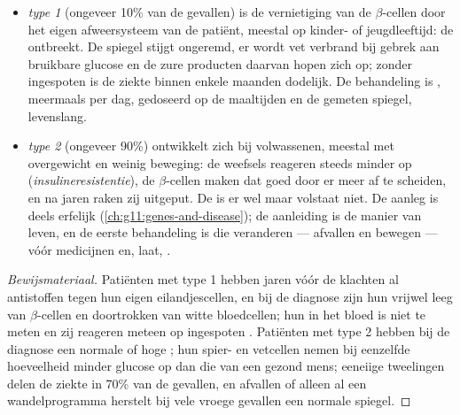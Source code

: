 \begin{proposition}\label{prop:g12:glucose-and-diabetes:types}
\begin{itemize}
  \item \emph{ type 1} (ongeveer 10\% van de gevallen) is de
        vernietiging van de $\beta$-cellen door het eigen afweersysteem
        van de patiënt, meestal op kinder- of jeugdleeftijd: de 
        ontbreekt. De spiegel stijgt ongeremd, er wordt vet verbrand bij
        gebrek aan bruikbare glucose en de zure producten daarvan hopen
        zich op; zonder ingespoten  is de ziekte binnen enkele
        maanden dodelijk. De behandeling is , meermaals per dag,
        gedoseerd op de maaltijden en de gemeten spiegel, levenslang.
  \item \emph{ type 2} (ongeveer 90\%) ontwikkelt zich bij
        volwassenen, meestal met overgewicht en weinig beweging: de
        weefsels reageren steeds minder op 
        (\emph{insulineresistentie}), de $\beta$-cellen maken dat goed
        door er meer af te scheiden, en na jaren raken zij uitgeput. De
         is er wel maar volstaat niet. De aanleg is deels
        erfelijk (\cref{ch:g11:genes-and-disease}); de aanleiding is de
        manier van leven, en de eerste behandeling is die veranderen ---
        afvallen en bewegen --- vóór medicijnen en, laat, .
\end{itemize}
\end{proposition}
\begin{proof}[Bewijsmateriaal]
Patiënten met type 1 hebben jaren vóór de klachten al antistoffen tegen
hun eigen eilandjescellen, en bij de diagnose zijn hun  vrijwel
leeg van $\beta$-cellen en doortrokken van witte bloedcellen; hun 
in het bloed is niet te meten en zij reageren meteen op ingespoten
. Patiënten met type 2 hebben bij de diagnose een normale of hoge
; hun spier- en vetcellen nemen bij eenzelfde hoeveelheid 
minder glucose op dan die van een gezond mens; eeneiige tweelingen delen
de ziekte in 70\% van de gevallen, en afvallen of alleen al een
wandelprogramma herstelt bij vele vroege gevallen een normale spiegel.
\end{proof}

